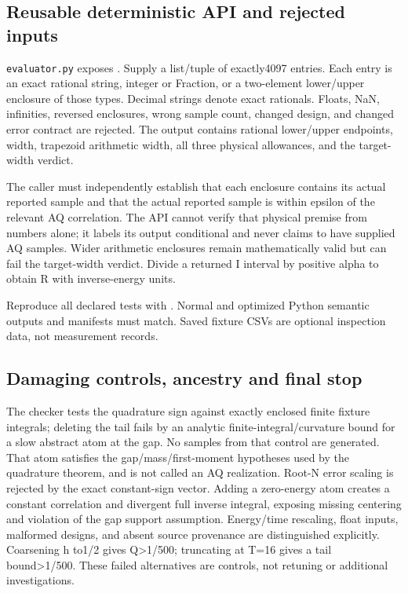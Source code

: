 \hypertarget{r30-at3-forward-reusable-deterministic-api-and-rejected-inputs}{%
\subsection{Reusable deterministic API and rejected inputs}\label{r30:at3:forward:r30-at3-forward-reusable-deterministic-api-and-rejected-inputs}}

\texttt{evaluator.py} exposes {\small{}}. Supply a list/tuple of exactly4097 entries. Each entry is an exact rational string, integer or Fraction, or a two-element lower/upper enclosure of those types. Decimal strings denote exact rationals. Floats, NaN, infinities, reversed enclosures, wrong sample count, changed design, and changed error contract are rejected. The output contains rational lower/upper endpoints, width, trapezoid arithmetic width, all three physical allowances, and the target-width verdict.

The caller must independently establish that each enclosure contains its actual reported sample and that the actual reported sample is within epsilon of the relevant AQ correlation. The API cannot verify that physical premise from numbers alone; it labels its output conditional and never claims to have supplied AQ samples. Wider arithmetic enclosures remain mathematically valid but can fail the target-width verdict. Divide a returned I interval by positive alpha to obtain R with inverse-energy units.

Reproduce all declared tests with {\small{}}. Normal and optimized Python semantic outputs and manifests must match. Saved fixture CSVs are optional inspection data, not measurement records.

\hypertarget{r30-at3-forward-damaging-controls-ancestry-and-final-stop}{%
\subsection{Damaging controls, ancestry and final stop}\label{r30:at3:forward:r30-at3-forward-damaging-controls-ancestry-and-final-stop}}

The checker tests the quadrature sign against exactly enclosed finite fixture integrals; deleting the tail fails by an analytic finite-integral/curvature bound for a slow abstract atom at the gap. No samples from that control are generated. That atom satisfies the gap/mass/first-moment hypotheses used by the quadrature theorem, and is not called an AQ realization. Root-N error scaling is rejected by the exact constant-sign vector. Adding a zero-energy atom creates a constant correlation and divergent full inverse integral, exposing missing centering and violation of the gap support assumption. Energy/time rescaling, float inputs, malformed designs, and absent source provenance are distinguished explicitly. Coarsening h to1/2 gives Q\textgreater1/500; truncating at T=16 gives a tail bound\textgreater1/500. These failed alternatives are controls, not retuning or additional investigations.

